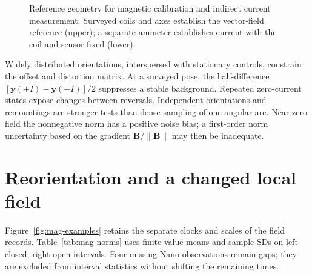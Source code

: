 \begin{figure}[t]
\centering
{}
\caption{Reference geometry for magnetic calibration and indirect current measurement. Surveyed coils and axes establish the vector-field reference (upper); a separate ammeter establishes current with the coil and sensor fixed (lower).}
\label{fig:mag-apparatus}
\end{figure}

Widely distributed orientations, interspersed with stationary controls, constrain the offset and distortion matrix. At a surveyed pose, the half-difference $[\bm y(+I)-\bm y(-I)]/2$ suppresses a stable background. Repeated zero-current states expose changes between reversals. Independent orientations and remountings are stronger tests than dense sampling of one angular arc. Near zero field the nonnegative norm has a positive noise bias; a first-order norm uncertainty based on the gradient $\bm B/\|\bm B\|$ may then be inadequate.

\section{Reorientation and a changed local field}
Figure~\ref{fig:mag-examples} retains the separate clocks and scales of the field records. Table~\ref{tab:mag-norms} uses finite-value means and sample SDs on left-closed, right-open intervals. Four missing Nano observations remain gaps; they are excluded from interval statistics without shifting the remaining times.

